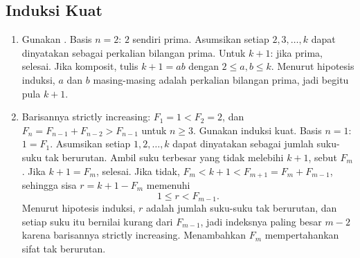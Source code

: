 \documentclass[12pt]{scrartcl}
\begin{document}
\subsection{Induksi Kuat}

\begin{enumerate}[resume]
	\item Gunakan .
	Basis $n = 2$: $2$ sendiri prima.
	Asumsikan setiap $2, 3, \dots, k$ dapat dinyatakan
	sebagai perkalian bilangan prima.
	Untuk $k+1$: jika prima, selesai.
	Jika komposit, tulis $k+1 = ab$ dengan $2 \le a, b \le k$.
	Menurut hipotesis induksi, $a$ dan $b$ masing-masing adalah
	perkalian bilangan prima, jadi begitu pula $k+1$.

	\item Barisannya strictly increasing: $F_1 = 1 < F_2 = 2$,
	dan $F_n = F_{n-1} + F_{n-2} > F_{n-1}$ untuk $n \ge 3$.
	Gunakan induksi kuat. Basis $n = 1$: $1 = F_1$.
	Asumsikan setiap $1, 2, \dots, k$ dapat dinyatakan sebagai jumlah
	suku-suku tak berurutan.
	Ambil suku terbesar yang tidak melebihi $k+1$, sebut $F_m$.
	Jika $k+1 = F_m$, selesai.
	Jika tidak, $F_m < k+1 < F_{m+1} = F_m + F_{m-1}$, sehingga
	sisa $r = k+1 - F_m$ memenuhi
	\[ 1 \le r < F_{m-1}. \]
	Menurut hipotesis induksi, $r$ adalah jumlah suku-suku tak berurutan,
	dan setiap suku itu bernilai kurang dari $F_{m-1}$,
	jadi indeksnya paling besar $m-2$ karena barisannya strictly increasing.
	Menambahkan $F_m$ mempertahankan sifat tak berurutan.


\end{enumerate}
\end{document}
